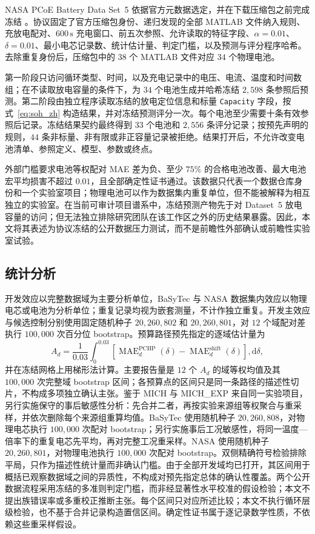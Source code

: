 \documentclass[UTF8,11pt]{ctexart}
\begin{document}
NASA PCoE Battery Data Set~5 依据官方元数据选定，并在下载压缩包之前完成冻结 \citep{saha2007nasa}。协议固定了官方压缩包身份、递归发现的全部 MATLAB 文件纳入规则、充放电配对、$600\,\mathrm{s}$ 充电窗口、前五次参照、允许读取的特征字段、$\alpha=0.01$、$\delta=0.01$、最小电芯记录数、统计估计量、判定门槛，以及预测与评分程序哈希。去除重复身份后，压缩包中的 $38$ 个 MATLAB 文件对应 $34$ 个物理电池。

第一阶段只访问循环类型、时间，以及充电记录中的电压、电流、温度和时间数组；在不读取放电容量的条件下，为 $34$ 个电池生成并哈希冻结 $2{,}598$ 条参照后预测。第二阶段由独立程序读取冻结的放电定位信息和标量 \texttt{Capacity} 字段，按式~\eqref{eq:soh_zh} 构造结果，并对冻结预测评分一次。每个电池至少需要十条有效参照后记录。冻结结果契约最终得到 $33$ 个电池和 $2{,}556$ 条评分记录；按预先声明的规则，$44$ 条非标量、非有限或非正容量记录被拒绝。结果打开后，不允许改变电池清单、参照定义、模型、参数或终点。

外部门槛要求电池等权配对 MAE 差为负、至少 $75\%$ 的合格电池改善、最大电池宏平均损害不超过 $0.01$，且全部确定性证书通过。该数据只代表一个数据仓库身份和一个实验室项目；物理电池可以作为数据集内重复单位，但不能被解释为相互独立的实验室。在当前可审计项目谱系中，冻结预测产物先于对 Dataset~5 放电容量的访问；但无法独立排除研究团队在该工作区之外的历史结果暴露。因此，本文将其表述为协议冻结的公开数据压力测试，而不是前瞻性外部确认或前瞻性实验室试验。

\subsection{统计分析}

开发效应以完整数据域为主要分析单位，BaSyTec 与 NASA 数据集内效应以物理电芯或电池为分析单位；重复记录均视为嵌套测量，不计作独立重复。开发主效应与候选控制分别使用固定随机种子 $20{,}260{,}802$ 和 $20{,}260{,}801$，对 $12$ 个域配对差执行 $100{,}000$ 次百分位 bootstrap。预算路径预先指定的逐域估计量为
\begin{equation}
A_d=\frac{1}{0.03}\int_{0}^{0.03}
\left[\operatorname{MAE}^{\mathrm{PCHP}}_d(\delta)-
\operatorname{MAE}^{\mathrm{shift}}_d(\delta)\right],\mathrm d\delta,
\label{eq:budget_auc_zh}
\end{equation}
并在冻结网格上用梯形法计算。主要报告量是 $12$ 个 $A_d$ 的域等权均值及其 $100{,}000$ 次完整域 bootstrap 区间；各预算点的区间只是同一条路径的描述性切片，不构成多项独立确认主张。鉴于 MICH 与 MICH\_EXP 来自同一实验项目，另行实施保守的事后敏感性分析：先合并二者，再按实验来源组等权聚合与重采样，并依次删除每个来源组重算均值。BaSyTec 使用随机种子 $20{,}260{,}808$，对物理电芯执行 $100{,}000$ 次配对 bootstrap；另行实施事后工况敏感性，将同一温度—倍率下的重复电芯先平均，再对完整工况重采样。NASA 使用随机种子 $20{,}260{,}801$，对物理电池执行 $100{,}000$ 次配对 bootstrap。双侧精确符号检验排除平局，只作为描述性统计量而非确认门槛。由于全部开发域均已打开，其区间用于概括已观察数据域之间的异质性，不构成对预先指定总体的确认性覆盖。两个公开数据流程采用冻结的多准则判定门槛，而非经显著性水平校准的假设检验；本文不提出族错误率或多重校正推断主张。每个区间只对应所述比较；本文不执行循环层级检验，也不基于合并记录构造置信区间。确定性证书属于逐记录数学性质，不依赖这些重采样假设。
\end{document}

